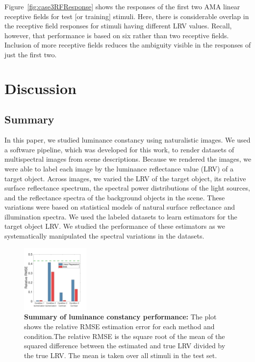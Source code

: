 \documentclass{jov}
\begin{document}
Figure~\ref{fig:case3RFResponse} shows the responses of the first two AMA linear receptive fields for test [or training] stimuli.
Here, there is considerable overlap in the receptive field responses for stimuli having different LRV values.
Recall, however, that performance is based on six rather than two receptive fields.
Inclusion of more receptive fields reduces the ambiguity visible in the responses of just the first two.

\section{Discussion} \label{Discussion}

\subsection{Summary}

In this paper, we studied luminance constancy using naturalistic images.
We used a software pipeline, which was developed for this work, to render datasets of multispectral images from scene descriptions.
Because we rendered the images, we were able to label each image by the luminance reflectance value (LRV) of a target object.
Across images, we varied the LRV of the target object, its relative surface reflectance spectrum, 
the spectral power distributions of the light sources, and the reflectance spectra of the background objects in the scene.
These variations were based on statistical models of natural surface reflectance and illumination spectra.
We used the labeled datasets to learn estimators for the target object LRV.
We studied the performance of these estimators as we systematically manipulated the 
spectral variations in the datasets.

\begin{figure}
\centering
\includegraphics[width=0.3\textwidth]{../FiguresDraft4/Figure13/Figure13_a.pdf}
\caption{{\bf Summary of luminance constancy performance:} The plot shows the relative RMSE estimation error for each method and condition.The relative RMSE is the square root of the mean of the squared difference between the estimated and true LRV divided by the true LRV. The mean is taken over all stimuli in the test set.}
 \label{fig:barGraphs}
\end{figure}
\end{document}
